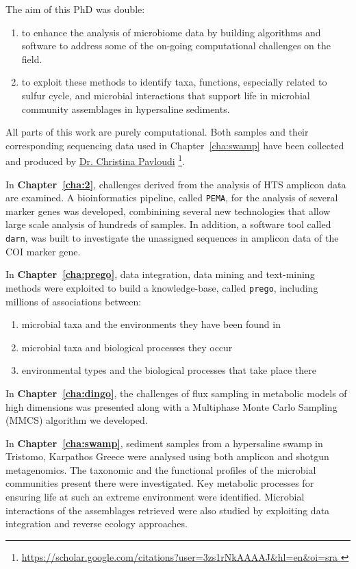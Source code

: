    The aim of this PhD was double:
   \begin{enumerate}
      \item to enhance the analysis of microbiome data by building algorithms and software 
            to address some of the on-going computational challenges on the field.
      \item to exploit these methods to identify taxa, functions, especially related to sulfur cycle, 
            and microbial interactions that support life in microbial community assemblages in hypersaline sediments.
   \end{enumerate}
   All parts of this work are purely computational. 
   Both samples and their corresponding sequencing data used in Chapter~\ref{cha:swamp} have been collected 
   and produced by 
   \href{https://scholar.google.com/citations?user=3zs1rNkAAAAJ&hl=en&oi=sra}{Dr. Christina Pavloudi} \footnote{
      \href{https://scholar.google.com/citations?user=3zs1rNkAAAAJ&hl=en&oi=sra}{
         https://scholar.google.com/citations?user=3zs1rNkAAAAJ\&hl=en\&oi=sra
      }
   }. 

   In \textbf{Chapter~\ref{cha:2}}, challenges derived from the analysis of HTS amplicon data are examined.
   A bioinformatics pipeline, called \texttt{PEMA}, for the analysis of several marker genes was developed, combinining several new technologies that allow large scale analysis of hundreds of samples. 
   In addition, a software tool called \texttt{darn}, was built to investigate the unassigned sequences in amplicon data of the COI marker gene. 

   In \textbf{Chapter~\ref{cha:prego}}, data integration, data mining and text-mining methods were exploited to build a knowledge-base, called \texttt{prego}, including millions of associations between:
   \begin{enumerate}
      \item microbial taxa and the environments they have been found in 
      \item microbial taxa and biological processes they occur
      \item environmental types and the biological processes that take place there
   \end{enumerate}

   In \textbf{Chapter~\ref{cha:dingo}}, the challenges of flux sampling in metabolic models of high dimensions was presented along with a Multiphase Monte Carlo Sampling (MMCS) algorithm we developed. 

   In \textbf{Chapter~\ref{cha:swamp}}, sediment samples from a hypersaline swamp in Tristomo, Karpathos Greece were analysed using both amplicon and shotgun metagenomics. 
   The taxonomic and the functional profiles of the microbial communities present there were investigated. 
   Key metabolic processes for ensuring life at such an extreme environment were identified.
   Microbial interactions of the assemblages retrieved were also studied by exploiting 
   data integration and reverse ecology approaches.  

